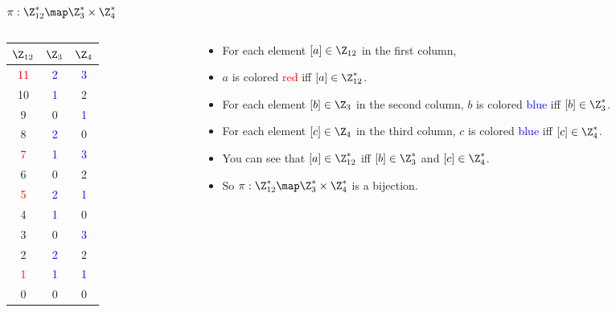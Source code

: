 \documentclass[handout]{beamer}
\begin{document}
\begin{frame}{$\pi:\Z^*_{12} \map \Z^*_3\times \Z^*_4$}

\begin{columns}
\begin{column}{0.33\textwidth}

\begin{tabular}{|c||c|c|}\hline
$\Z_{12}$   &  $\Z_3$ & $\Z_4$ \\ \hline\hline
\textcolor{red}{11} &   \textcolor{blue}{2}  &   \textcolor{blue}{3}   \\ \hline
10                  &   \textcolor{blue}{1}  &   2                     \\ \hline
9                   &   0                    &   \textcolor{blue}{1}   \\ \hline
8                   &   \textcolor{blue}{2}  &   0                     \\ \hline
\textcolor{red}{7}  &   \textcolor{blue}{1}  &   \textcolor{blue}{3}   \\ \hline
6                   &   0                    &   2                     \\ \hline
\textcolor{red}{5}  &   \textcolor{blue}{2}  &   \textcolor{blue}{1}   \\ \hline
4                   &   \textcolor{blue}{1}  &   0                     \\ \hline
3                   &   0                    &   \textcolor{blue}{3}   \\ \hline
2                   &   \textcolor{blue}{2}  &   2                     \\ \hline
\textcolor{red}{1}  &   \textcolor{blue}{1}  & \textcolor{blue}{1}     \\ \hline
0                   &   0                    &   0                     \\ \hline
\end{tabular}

\end{column}

\begin{column}{0.67\textwidth}

\begin{itemize}
  \item For each element $[a]\in\Z_{12}$ in the first column,
  \item $a$ is colored \textcolor{red}{red} iff $[a]\in\Z^*_{12}$.
  \item For each element $[b]\in\Z_{3}$ in the second column, $b$ is colored \textcolor{blue}{blue}
  iff $[b]\in\Z^*_3$.
  \item For each element $[c]\in\Z_{4}$ in the third column, $c$ is colored \textcolor{blue}{blue}
  iff $[c]\in\Z^*_4$.
  \item You can see that $[a]\in\Z^*_{12}$ iff $[b]\in\Z^*_3$ and $[c]\in\Z^*_4$.
  \item So $\pi:\Z^*_{12} \map \Z^*_3\times \Z^*_4$ is a bijection.
\end{itemize}

\end{column}
\end{columns}

\end{frame}
\end{document}
